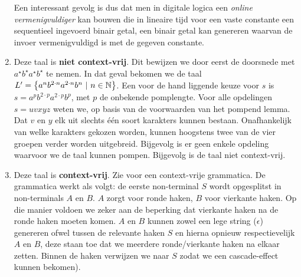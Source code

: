 \documentclass{article}
\begin{document}
\begin{question}
\begin{answer}
\begin{enumerate}
 Een interessant gevolg is dus dat men in digitale logica een \emph{online vermenigvuldiger} kan bouwen die in lineaire tijd voor een vaste constante een sequentieel ingevoerd binair getal, een binair getal kan genereren waarvan de invoer vermenigvuldigd is met de gegeven constante.
 \item Deze taal is \textbf{niet context-vrij}. Dit bewijzen we door eerst de doorsnede met $a^{\star}b^{\star}a^{\star}b^{\star}$ te nemen. In dat geval bekomen we de taal $L'=\left\{ a^nb^{2\cdot n}a^{2\cdot n}b^n\ |\ n\in\mathbb{N} \right\}$. Een voor de hand liggende keuze voor $s$ is $s=a^pb^{2\cdot p}a^{2\cdot p}b^p$, met $p$ de onbekende pomplengte. Voor alle opdelingen $s=uvxyz$ weten we, op basis van de voorwaarden van het pompend lemma. Dat $v$ en $y$ elk uit slechts \'e\'en soort karakters kunnen bestaan. Onafhankelijk van welke karakters gekozen worden, kunnen hoogstens twee van de vier groepen verder worden uitgebreid. Bijgevolg is er geen enkele opdeling waarvoor we de taal kunnen pompen. Bijgevolg is de taal niet context-vrij.
 \item Deze taal is \textbf{context-vrij}. Zie  voor een context-vrije grammatica.
 De grammatica werkt als volgt: de eerste non-terminal $S$ wordt opgesplitst in non-terminals $A$ en $B$. $A$ zorgt voor ronde haken, $B$ voor vierkante haken. Op die manier voldoen we zeker aan de beperking dat vierkante haken na de ronde haken moeten komen. $A$ en $B$ kunnen zowel een lege string ($\epsilon$) genereren ofwel tussen de relevante haken $S$ en hierna opnieuw respectievelijk $A$ en $B$, deze staan toe dat we meerdere ronde/vierkante haken na elkaar zetten. Binnen de haken verwijzen we naar $S$ zodat we een cascade-effect kunnen bekomen).
\end{enumerate}
\end{answer}
\end{question}
\end{document}
